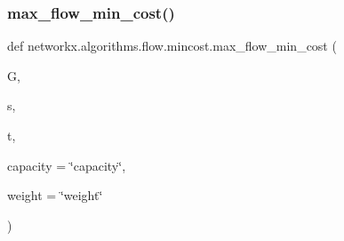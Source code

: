 \subsubsection{\texorpdfstring{max\+\_\+flow\+\_\+min\+\_\+cost()}{max\_flow\_min\_cost()}}
{\footnotesize\ttfamily def networkx.\+algorithms.\+flow.\+mincost.\+max\+\_\+flow\+\_\+min\+\_\+cost (\begin{DoxyParamCaption}\item[{}]{G,  }\item[{}]{s,  }\item[{}]{t,  }\item[{}]{capacity = {\ttfamily \char`\"{}capacity\char`\"{}},  }\item[{}]{weight = {\ttfamily \char`\"{}weight\char`\"{}} }\end{DoxyParamCaption})}

